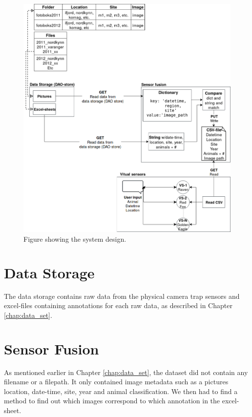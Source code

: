 \documentclass[USenglish]{uit-thesis}
\begin{document}
\begin{figure}
\centering
\includegraphics[width=\textwidth]{Design.png}
\caption{Figure showing the system design.}
\label{fig:design}
\end{figure}

\section{Data Storage}

The data storage contains raw data from the physical camera trap sensors and excel-files containing annotations for each raw data, as described in Chapter \ref{chap:data_set}.


\section{Sensor Fusion} \label{sec:des_fused}
As mentioned earlier in Chapter \ref{chap:data_set}, the dataset did not contain any filename or a filepath. It only contained image metadata such as a pictures location, date-time, site, year and animal classification. We then had to find a method to find out which images correspond to which annotation in the excel-sheet.
\end{document}
